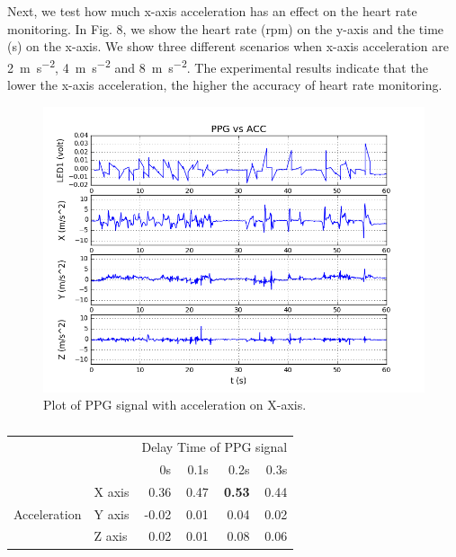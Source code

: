\documentclass[11pt, draftclsnofoot, onecolumn]{IEEEtran}
\begin{document}
    Next, we test how much x-axis acceleration has an effect on the heart rate monitoring. In Fig. 8, we show the heart rate (rpm) on the y-axis and the time (s) on the x-axis. We show three different scenarios when x-axis acceleration are \SI[per-mode=symbol]{2}{\metre\per\second\squared}, \SI[per-mode=symbol]{4}{\metre\per\second\squared} and \SI[per-mode=symbol]{8}{\metre\per\second\squared}. The experimental results indicate that the lower the x-axis acceleration, the higher the accuracy of heart rate monitoring.
    
    \begin{figure}[ht]	
        \centering
        \includegraphics[scale=0.50]{x_acc_ppg_acc_19} 
        \caption{Plot of PPG signal with acceleration on X-axis.}
        \label{fig:X_AccPPG}
    \end{figure}
    
    \begin{table}[ht]
	\centering
        \caption{}
		\label{table:X_AccPPG}
		\begin{tabular}{ l l|r|r|r|r| }
			\cline{3-6}
            & & \multicolumn{4}{|c|}{Delay Time of PPG signal} \\
            \cline{3-6}
            	& & 0s & 0.1s & 0.2s & 0.3s  \\
			\hline
            \multicolumn{1}{|c|}{\multirow{3}{*}{Acceleration}} 
            	& X axis & 0.36  & 0.47 & \textbf{0.53} & 0.44  \\
            \cline{2-6}
            \multicolumn{1}{|c|}{} 
            	& Y axis & -0.02 & 0.01 & 0.04 & 0.02  \\
            \cline{2-6}
            \multicolumn{1}{|c|}{} 
            	& Z axis & 0.02  & 0.01 & 0.08 & 0.06  \\
			\hline
		\end{tabular}
	\end{table}
\end{document}

